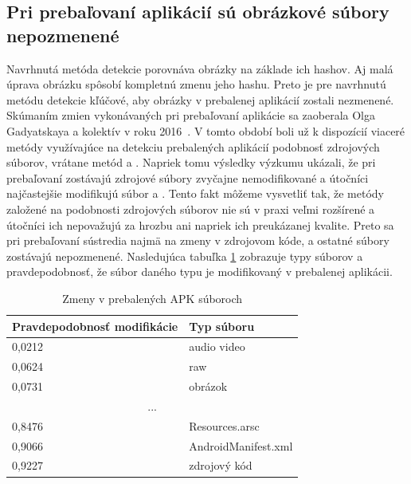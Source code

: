 \subsection*{Pri prebaľovaní aplikácií sú obrázkové súbory nepozmenené}
Navrhnutá metóda detekcie porovnáva obrázky na základe ich hashov. Aj malá úprava obrázku spôsobí kompletnú zmenu jeho hashu. Preto je pre navrhnutú metódu detekcie kľúčové, aby obrázky v prebalenej aplikácií zostali nezmenené. Skúmaním zmien vykonávaných pri prebaľovaní aplikácie sa zaoberala Olga Gadyatskaya a kolektív v roku 2016~\cite{Gadyatskaya2016}. V tomto období boli už k dispozícií viaceré metódy využívajúce na detekciu prebalených aplikácií podobnosť zdrojových súborov, vrátane metód  a . Napriek tomu výsledky výzkumu ukázali, že pri prebaľovaní zostávajú zdrojové súbory zvyčajne nemodifikované a útočníci najčastejšie modifikujú súbor  a . Tento fakt môžeme vysvetliť tak, že metódy založené na podobnosti zdrojových súborov nie sú v praxi veľmi rozšírené a útočníci ich nepovažujú za hrozbu ani napriek ich preukázanej kvalite. Preto sa pri prebaľovaní sústredia najmä na zmeny v zdrojovom kóde, a ostatné súbory zostávajú nepozmenené. Nasledujúca tabuľka \ref{repacakged-changes} zobrazuje typy súborov a pravdepodobnosť, že súbor daného typu je modifikovaný v prebalenej aplikácii.

\begin{table}[]
\centering
\label{repacakged-changes}
\begin{tabular}{|l|l|}
\hline
\textbf{Pravdepodobnosť modifikácie} & \textbf{Typ súboru}          \\ \hline
0,0212                                      & audio video         \\
0,0624                                      & raw                 \\
0,0731                                      & obrázok             \\
\multicolumn{2}{|c|}{...} \\
0,8476                                      & Resources.arsc      \\
0,9066                                      & AndroidManifest.xml \\
0,9227                                      & zdrojový kód        \\
\hline
\end{tabular}
\caption{Zmeny v prebalených APK súboroch}
\end{table}


